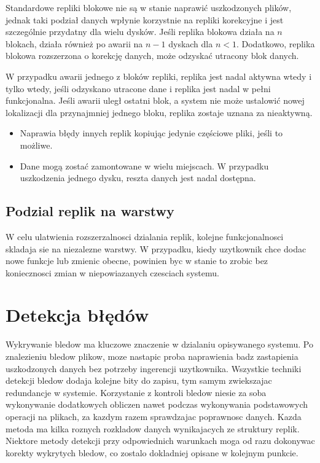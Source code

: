 Standardowe repliki blokowe nie są w stanie naprawić uszkodzonych plików, jednak taki podział danych wpłynie korzystnie na repliki korekcyjne i jest szczególnie przydatny dla wielu dysków. Jeśli replika blokowa działa na $n$ blokach, działa również po awarii na $n-1$ dyskach dla $n < 1$. Dodatkowo, replika blokowa rozszerzona o korekcję danych, może odzyskać utracony blok danych.

W przypadku awarii jednego z bloków repliki, replika jest nadal aktywna wtedy i tylko wtedy, jeśli odzyskano utracone dane i replika jest nadal w pełni funkcjonalna. Jeśli awarii uległ ostatni blok, a system nie może ustalowić nowej lokalizacji dla przynajmniej jednego bloku, replika zostaje uznana za nieaktywną.
\begin{itemize}
    \item Naprawia błędy innych replik kopiując jedynie częściowe pliki, jeśli to możliwe.
    \item Dane mogą zostać zamontowane w wielu miejscach. W przypadku uszkodzenia jednego dysku, reszta danych jest nadal dostępna.
\end{itemize}

\subsection{Podzial replik na warstwy}
W celu ulatwienia rozszerzalnosci dzialania replik, kolejne funkcjonalnosci skladaja sie na niezalezne warstwy. W przypadku, kiedy uzytkownik chce dodac nowe funkcje lub zmienic obecne, powinien byc w stanie to zrobic bez koniecznosci zmian w niepowiazanych czesciach systemu.


\section {Detekcja błędów}
    Wykrywanie bledow ma kluczowe znaczenie w dzialaniu opisywanego systemu. Po znalezieniu bledow plikow, moze nastapic proba naprawienia badz zastapienia uszkodzonych danych bez potrzeby ingerencji uzytkownika. Wszystkie techniki detekcji bledow dodaja kolejne bity do zapisu, tym samym zwiekszajac redundancje w systemie. Korzystanie z kontroli bledow niesie za soba wykonywanie dodatkowych obliczen nawet podczas wykonywania podstawowych operacji na plikach, za kazdym razem sprawdzajac poprawnosc danych. Kazda metoda ma kilka roznych rozkladow danych wynikajacych ze struktury replik. Niektore metody detekcji przy odpowiednich warunkach moga od razu dokonywac korekty wykrytych bledow, co zostalo dokladniej opisane w kolejnym punkcie.
